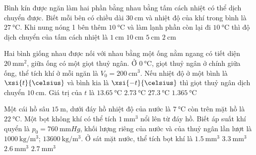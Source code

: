 \begin{ex}
	Bình kín được ngăn làm hai phần bằng nhau bằng tấm cách nhiệt có thể dịch chuyển được. Biết mỗi bên có chiều dài $\SI{30}{\centi\meter}$ và nhiệt độ của khí trong bình là $\SI{27}{\celsius}$. Khi nung nóng 1 bên thêm $\SI{10}{\celsius}$ và làm lạnh phần còn lại đi $\SI{10}{\celsius}$ thì độ dịch chuyển của tấm cách nhiệt là
	\choice
	{\True $\SI{1}{\centi\meter}$}
	{$\SI{10}{\centi\meter}$}
	{$\SI{5}{\centi\meter}$}
	{$\SI{2}{\centi\meter}$}
\end{ex}
\begin{ex}
Hai bình giống nhau được nối với nhau bằng một ống nằm ngang có tiết diện $\SI{20}{\milli\meter^2}$, giữa ống có một giọt thuỷ ngân. Ở $\SI{0}{\celsius}$, giọt thuỷ ngân ở chính giữa ống, thể tích khí ở mỗi ngăn là $V_0=\SI{200}{\centi\meter^3}$. Nếu nhiệt độ ở một bình là $\xsi{t}{\celsius}$ và bình kia là $\xsi{-t}{\celsius}$ thì giọt thuỷ ngân dịch chuyển $\SI{10}{\centi\meter}$. Giá trị của $t$ là	
	\choice
	{$\SI{13.65}{\celsius}$}
	{\True $\SI{2.73}{\celsius}$}
	{$\SI{27.3}{\celsius}$}
	{$\SI{1.365}{\celsius}$}
\end{ex}
\begin{ex}
Một cái hồ sâu $\SI{15}{\meter}$, dưới đáy hồ nhiệt độ của nước là $\SI{7}{\celsius}$ còn trên mặt hồ là $\SI{22}{\celsius}$. Một bọt không khí có thể tích $\SI{1}{\milli\meter^3}$ nổi lên từ đáy hồ. Biết áp suất khí quyển là $p_0=\SI{760}{\milli\meter Hg}$, khối lượng riêng của nước và của thuỷ ngân lần lượt là $\SI{1000}{\kilogram/\meter^3}$; $\SI{13600}{\kilogram/\meter^3}$. Ở sát mặt nước, thể tích bọt khí là	
	\choice
	{$\SI{1.5}{\milli\meter^3}$}
	{$\SI{3.3}{\milli\meter^3}$}
	{\True $\SI{2.6}{\milli\meter^3}$}
	{$\SI{2.7}{\milli\meter^3}$}
\end{ex}
